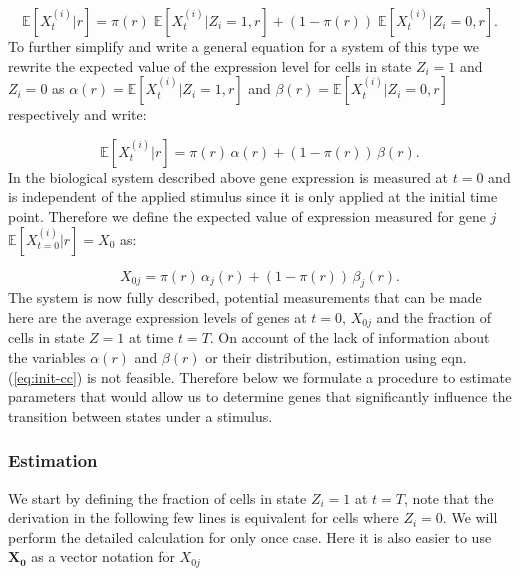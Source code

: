 \begin{equation}
  \mathbb{E} [X_t^{(i)} | r] = \pi(r)\; \mathbb{E} [X_t^{(i)} | Z_i =1, r] + \left( 1 - \pi(r) \right)\; \mathbb{E} [X_t^{(i)} | Z_i =0, r].
\end{equation}
To further simplify and write a general equation for a system of this type we rewrite the expected value of the expression level for cells in state $Z_i = 1$ and $Z_i = 0$ as $\alpha(r) = \mathbb{E} [X_t^{(i)} | Z_i =1, r]$ and  $\beta(r) =  \mathbb{E} [X_t^{(i)} | Z_i = 0, r]$ respectively and write:

\begin{equation}
  \label{eq:general-cc}
  \mathbb{E} [X_t^{(i)} | r] = \pi(r) \, \alpha(r) + \left( 1 - \pi(r) \right) \, \beta(r). 
\end{equation}
In the biological system described above gene expression is measured at $t=0$ and is independent of the applied stimulus since it is only applied at the initial time point. Therefore we define the expected value of expression measured for gene $j$  $\mathbb{E}[X_{t=0}^{(i)} | r] = X_0 $ as:

\begin{equation}
  \label{eq:init-cc}
  X_{0j} = \pi(r) \, \alpha_j(r) + \left( 1 - \pi(r) \right) \, \beta_j(r). 
\end{equation}
The system is now fully described, potential measurements that can be made here are the average expression levels of genes at $t=0$, $X_{0j}$ and the fraction of cells in state $Z = 1$ at time $t=T$. On account of the lack of information about the variables $\alpha(r)$ and $\beta(r)$ or their distribution, estimation using eqn. (\ref{eq:init-cc}) is not feasible. Therefore below we formulate a procedure to estimate parameters that would allow us to determine genes that significantly influence the transition between states under a stimulus.

\subsubsection{Estimation}
\label{sec:estimation-cc}

We start by defining the fraction of cells in state $Z_i = 1$ at $t = T$, note that the derivation in the following few lines is equivalent for cells where $Z_i =0 $. We will perform the detailed calculation for only once case. Here it is also easier to use $\mathbf{X_0}$ as a vector notation for $X_{0j}$

